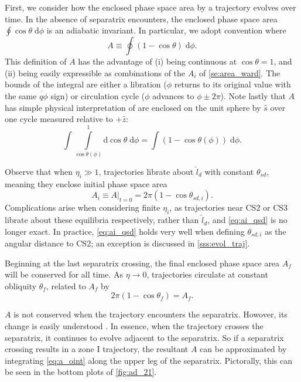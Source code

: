 \documentclass[
        fleqn,
        usenatbib,
    ]{mnras}
\newcommand*{\at}[1]{\left.#1\right|}
\newcommand*{\p}[1]{\left(#1\right)}
\begin{document}
First, we consider how the enclosed phase space area by a trajectory evolves
over time. In the absence of separatrix encounters, the enclosed phase space
area $\oint \cos\theta \;\mathrm{d}\phi$ is an adiabatic invariant. In
particular, we adopt convention where
\begin{equation}
    A \equiv \oint \p{1 - \cos \theta}\;\mathrm{d}\phi.\label{eq:a_oint}
\end{equation}
This definition of $A$ has the advantage of (i) being continuous at $\cos \theta
= 1$, and (ii) being easily expressible as combinations of the $A_i$ of
\autoref{se:area_ward}. The bounds of the integral are either a libration
($\phi$ returns to its original value with the same $\dot{q\phi}$ sign) or
circulation cycle ($\phi$ advances to $\phi \pm 2\pi$). Note lastly that $A$ has
simple physical interpretation of are enclosed on the unit sphere by $\hat{s}$
over one cycle measured relative to $+\hat{z}$:
\begin{equation*}
    \int \int\limits_{\cos \theta(\phi)}^1
        \mathrm{d}\cos\theta\;\mathrm{d}\phi = \int \p{1 - \cos \theta(\phi)}
            \;\mathrm{d}\phi.
\end{equation*}

Observe that when $\eta_i \gg 1$, trajectories librate about $\hat{l}_d$ with
constant $\theta_{sd}$, meaning they enclose initial phase space area
\begin{equation}
    A_i \equiv \at{A}_{t = 0}
        = 2\pi\p{1 - \cos \theta_{sd, i}}.\label{eq:ai_qsd}
\end{equation}
Complications arise when considering finite $\eta_i$, as trajectories near CS2 or
CS3 librate about these equilibria respectively, rather than $\hat{l}_d$, and
\autoref{eq:ai_qsd} is no longer exact. In practice, \autoref{eq:ai_qsd} holds
very well when defining $\theta_{sd, i}$ as the angular distance to CS2; an
exception is discussed in \autoref{sss:evol_traj}.

Beginning at the last separatrix crossing, the final enclosed phase space area
$A_f$ will be conserved for all time. As $\eta \to 0$, trajectories circulate at
constant obliquity $\theta_f$, related to $A_f$ by
\begin{equation}
    2\pi\p{1 - \cos \theta_f} = A_f. \label{eq:qfaf}
\end{equation}

$A$ is not conserved when the trajectory encounters the separatrix. Howover,
its change is easily understood \citep{henrard1982}. In essence, when the
trajectory crosses the separatrix, it continues to evolve adjacent to the
separatrix. So if a separatrix crossing results in a zone I trajectory, the
resultant $A$ can be approximated by integrating \autoref{eq:a_oint} along the
upper leg of the separatrix. Pictorally, this can be seen in the bottom plots of
\autoref{fig:ad_21}.
\end{document}
